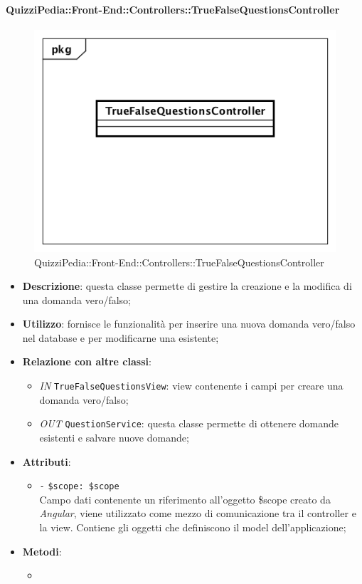 \paragraph{QuizziPedia::Front-End::Controllers::TrueFalseQuestionsController}
\begin{figure} [ht]
	\centering
	\includegraphics[scale=0.45]{UML/Classi/Front-End/QuizziPedia_Front-end_Controller_TrueFalseQuestionsController.png}
	\caption{QuizziPedia::Front-End::Controllers::TrueFalseQuestionsController}
\end{figure} \FloatBarrier
\begin{itemize}
	\item \textbf{Descrizione}: questa classe permette di gestire la creazione e la modifica di una domanda vero/falso;
	\item \textbf{Utilizzo}: fornisce le funzionalità per inserire una nuova domanda vero/falso nel database e per modificarne una esistente;
	\item \textbf{Relazione con altre classi}:
	\begin{itemize}
		\item \textit{IN} \texttt{TrueFalseQuestionsView}: view contenente i campi per creare una domanda vero/falso;  
		\item \textit{OUT} \texttt{QuestionService}: questa classe permette di ottenere domande esistenti e salvare nuove domande;
	\end{itemize}
	\item \textbf{Attributi}:
	\begin{itemize}
		\item \texttt{-} \texttt{\$scope: \$scope} \\
		Campo dati contenente un riferimento all’oggetto \$scope creato da \textit{Angular}, viene utilizzato come mezzo di comunicazione tra il controller e la view. Contiene gli oggetti che definiscono il model dell’applicazione;
	\end{itemize}
	\item \textbf{Metodi}:
	\begin{itemize}
		\item 
	\end{itemize}
\end{itemize}

